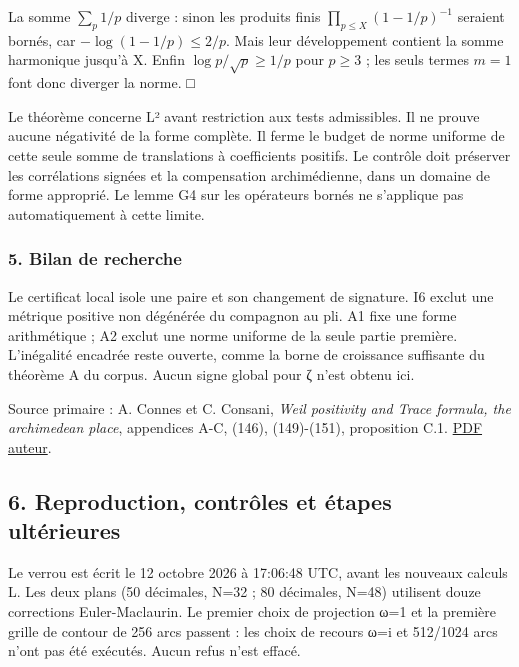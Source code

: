 \documentclass[
  10pt,
  a4paper,
]{article}
\begin{document}
La somme \(\sum_p1/p\) diverge : sinon les produits finis
\(\prod_{p\le X}(1-1/p)^{-1}\) seraient bornés, car
\(-\log(1-1/p)\le2/p\). Mais leur développement contient la somme
harmonique jusqu'à X. Enfin \(\log p/\sqrt p\ge1/p\) pour \(p\ge3\) ;
les seuls termes \(m=1\) font donc diverger la norme. □

Le théorème concerne L² avant restriction aux tests admissibles. Il ne
prouve aucune négativité de la forme complète. Il ferme le budget de
norme uniforme de cette seule somme de translations à coefficients
positifs. Le contrôle doit préserver les corrélations signées et la
compensation archimédienne, dans un domaine de forme approprié. Le lemme
G4 sur les opérateurs bornés ne s'applique pas automatiquement à cette
limite.

\hypertarget{bilan-de-recherche}{%
\subsubsection{5. Bilan de recherche}\label{bilan-de-recherche}}

Le certificat local isole une paire et son changement de signature. I6
exclut une métrique positive non dégénérée du compagnon au pli. A1 fixe
une forme arithmétique ; A2 exclut une norme uniforme de la seule partie
première. L'inégalité encadrée reste ouverte, comme la borne de
croissance suffisante du théorème A du corpus. Aucun signe global pour ζ
n'est obtenu ici.

Source primaire : A. Connes et C. Consani, \emph{Weil positivity and
Trace formula, the archimedean place}, appendices A-C, (146),
(149)-(151), proposition C.1.
\href{https://alainconnes.org/wp-content/uploads/Selecta.pdf}{PDF
auteur}.

\newpage

\hypertarget{reproduction-contruxf4les-et-uxe9tapes-ultuxe9rieures}{%
\subsection{6. Reproduction, contrôles et étapes
ultérieures}\label{reproduction-contruxf4les-et-uxe9tapes-ultuxe9rieures}}

Le verrou est écrit le 12 octobre 2026 à 17:06:48 UTC, avant les
nouveaux calculs L. Les deux plans (50 décimales, N=32 ; 80 décimales,
N=48) utilisent douze corrections Euler-Maclaurin. Le premier choix de
projection ω=1 et la première grille de contour de 256 arcs passent :
les choix de recours ω=i et 512/1024 arcs n'ont pas été exécutés. Aucun
refus n'est effacé.
\end{document}
